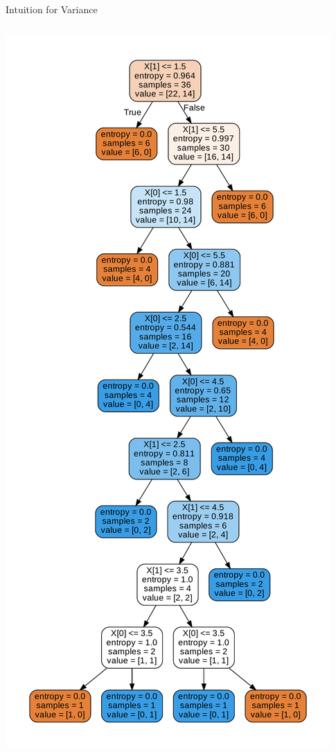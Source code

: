 \documentclass[aspectratio=169,10pt]{beamer}
\newcommand{\fitpic}[1]{\begin{adjustbox}{max width=\linewidth, max totalheight=0.78\textheight}#1\end{adjustbox}}
\begin{document}
	\begin{frame}{Intuition for Variance}
	\begin{columns}
		\begin{column}{0.5\textwidth}
			\begin{center}
			\fitpic{\includegraphics[scale=0.2]{var_1}}

\end{center}
\end{column}
\end{columns}
\end{frame}
\end{document}
